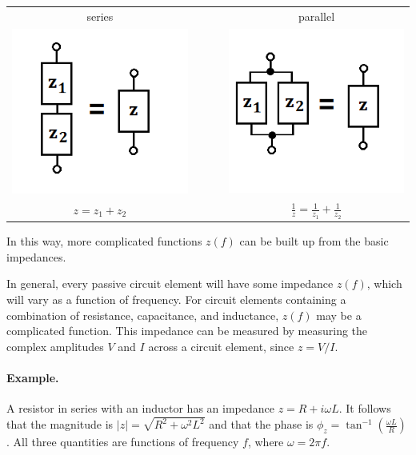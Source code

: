 \documentclass[11pt]{article}
\begin{document}
\begin{center}
\begin{tabular}{ccc}
series  & $\;\;\;\;\;\;$ & parallel  \\
\includegraphics[scale=.3]{images/series.png} &   &
\includegraphics[scale=.3]{images/parallel.png} \\
$z = z_1 + z_2$    &   & $\frac{1}{z} = \frac{1}{z_1} + \frac{1}{z_2}$ 
\end{tabular}
\end{center}
In this way, more complicated functions $z(f)$ can be built up from the basic impedances.

In general, every passive circuit element will have some impedance $z(f)$, which will vary as a function of frequency. For circuit elements containing a combination of resistance, capacitance, and inductance, $z(f)$ may be a complicated function. This impedance can be measured by measuring the complex amplitudes $V$ and $I$ across a circuit element, since $z = V/I$.

\paragraph*{Example.} A resistor in series with an inductor has an impedance $z = R + i\omega L$. It follows that the magnitude is $|z| = \sqrt{R^2 + \omega^2 L^2}$ and that the phase is $\phi_z = \tan^{-1} (\frac{\omega L}{R})$. All three quantities are functions of frequency $f$, where $\omega = 2\pi f$.
\end{document}
